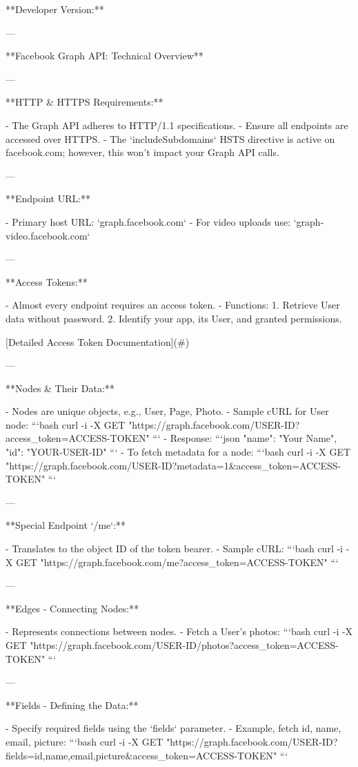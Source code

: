 **Developer Version:**

---

**Facebook Graph API: Technical Overview**

---

**HTTP & HTTPS Requirements:**

- The Graph API adheres to HTTP/1.1 specifications.
- Ensure all endpoints are accessed over HTTPS.
- The `includeSubdomains` HSTS directive is active on facebook.com; however, this won't impact your Graph API calls.

---

**Endpoint URL:**

- Primary host URL: `graph.facebook.com`
- For video uploads use: `graph-video.facebook.com`

---

**Access Tokens:**

- Almost every endpoint requires an access token.
- Functions:
  1. Retrieve User data without password.
  2. Identify your app, its User, and granted permissions.

[Detailed Access Token Documentation](#)

---

**Nodes & Their Data:**

- Nodes are unique objects, e.g., User, Page, Photo.
- Sample cURL for User node: 
```bash
curl -i -X GET "https://graph.facebook.com/USER-ID?access_token=ACCESS-TOKEN"
```
- Response:
```json
{
  "name": "Your Name",
  "id": "YOUR-USER-ID"
}
```
- To fetch metadata for a node:
```bash
curl -i -X GET "https://graph.facebook.com/USER-ID?metadata=1&access_token=ACCESS-TOKEN"
```

---

**Special Endpoint `/me`:**

- Translates to the object ID of the token bearer.
- Sample cURL:
```bash
curl -i -X GET "https://graph.facebook.com/me?access_token=ACCESS-TOKEN"
```

---

**Edges - Connecting Nodes:**

- Represents connections between nodes.
- Fetch a User's photos:
```bash
curl -i -X GET "https://graph.facebook.com/USER-ID/photos?access_token=ACCESS-TOKEN"
```

---

**Fields - Defining the Data:**

- Specify required fields using the `fields` parameter.
- Example, fetch id, name, email, picture:
```bash
curl -i -X GET "https://graph.facebook.com/USER-ID?fields=id,name,email,picture&access_token=ACCESS-TOKEN"
```

